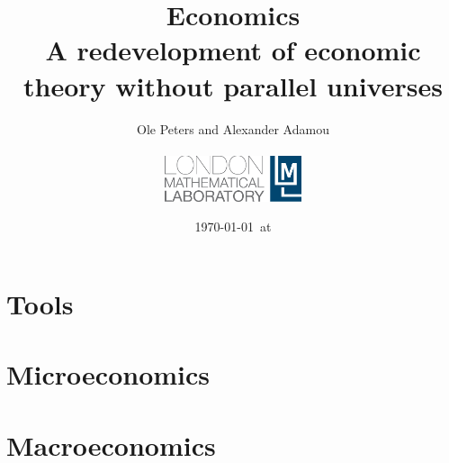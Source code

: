 


\title{Economics\\
\large{A redevelopment of economic theory without parallel universes}}
\author{Ole Peters and Alexander Adamou\\
\vspace{10cm}\\
\includegraphics[width=0.3\textwidth]{./lml_LOGO_whiteBG-eps-converted-to.pdf}}


\date{\today ~at \currenttime }

\maketitle

\tableofcontents

\part{Tools}

\part{Microeconomics}



\part{Macroeconomics}




\FloatBarrier
\printnoidxglossaries




